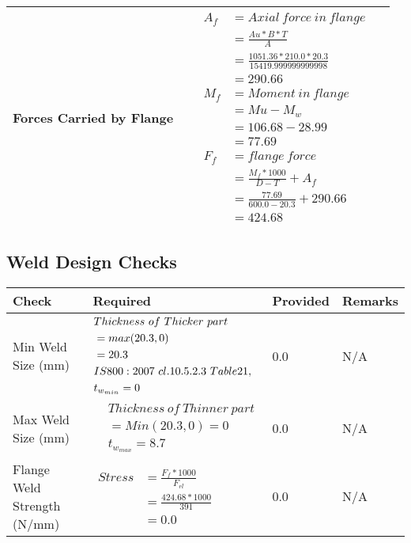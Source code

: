 \documentclass{article}%
\begin{document}
\begin{longtable}{|p{4cm}|p{5cm}|p{5.5cm}|p{1.5cm}|}
\hline%
Forces Carried by Flange&&$\begin{aligned} A_f&= Axial~force~ in ~flange  \\ &= \frac{Au * B *T}{A} \\ &= \frac{1051.36 * 210.0*20.3}{15419.999999999998} \\ &=290.66\\ M_f& =Moment~ in~ flange \\  & = Mu-M_w\\ &= 106.68-28.99\\ &=77.69\\  F_f& =flange~force  \\ & = \frac{M_f *1000}{D-T} + A_f \\ &= \frac{77.69}{600.0-20.3} +290.66 \\ &=424.68\end{aligned}$&\\%
\hline%
\end{longtable}

%
\newpage%
\subsection{Weld Design Checks}%
\label{subsec:WeldDesignChecks}%
\renewcommand{\arraystretch}{1.2}%
\begin{longtable}{|p{4cm}|p{5cm}|p{5.5cm}|p{1.5cm}|}%
\hline%
\rowcolor{OsdagGreen}%
Check&Required&Provided&Remarks\\%
\hline%
\endhead%
\hline%
Min Weld Size (mm)&$\begin{aligned} &Thickness~of~Thicker~part\\ \noindent &=max(20.3,0)\\ &=20.3\\ &IS800:2007~cl.10.5.2.3~Table 21,\\  &t_{w_{min}}=0\end{aligned}$&0.0&N/A\\%
\hline%
Max Weld Size (mm)&$\begin{aligned} & Thickness~of~Thinner~part\\ &=Min(20.3,0)=0\\ &t_{w_{max}} =8.7\end{aligned}$&0.0&N/A\\%
\hline%
Flange Weld Strength (N/mm)&$\begin{aligned} Stress &= \frac{F_f*1000}{F_{rl}}\\  &= \frac{424.68*1000}{391}\\ &= 0.0\end{aligned}$&0.0&N/A\\%
\hline%
\end{longtable}
\end{document}
